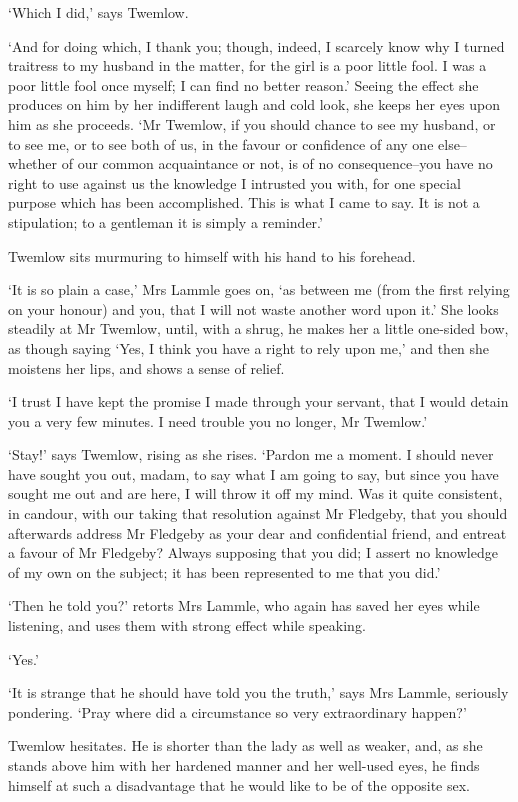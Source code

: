 ‘Which I did,’ says Twemlow.

‘And for doing which, I thank you; though, indeed, I scarcely know why
I turned traitress to my husband in the matter, for the girl is a poor
little fool. I was a poor little fool once myself; I can find no better
reason.’ Seeing the effect she produces on him by her indifferent laugh
and cold look, she keeps her eyes upon him as she proceeds. ‘Mr Twemlow,
if you should chance to see my husband, or to see me, or to see both of
us, in the favour or confidence of any one else--whether of our common
acquaintance or not, is of no consequence--you have no right to use
against us the knowledge I intrusted you with, for one special purpose
which has been accomplished. This is what I came to say. It is not a
stipulation; to a gentleman it is simply a reminder.’

Twemlow sits murmuring to himself with his hand to his forehead.

‘It is so plain a case,’ Mrs Lammle goes on, ‘as between me (from the
first relying on your honour) and you, that I will not waste another
word upon it.’ She looks steadily at Mr Twemlow, until, with a shrug,
he makes her a little one-sided bow, as though saying ‘Yes, I think you
have a right to rely upon me,’ and then she moistens her lips, and shows
a sense of relief.

‘I trust I have kept the promise I made through your servant, that I
would detain you a very few minutes. I need trouble you no longer, Mr
Twemlow.’

‘Stay!’ says Twemlow, rising as she rises. ‘Pardon me a moment. I should
never have sought you out, madam, to say what I am going to say, but
since you have sought me out and are here, I will throw it off my mind.
Was it quite consistent, in candour, with our taking that resolution
against Mr Fledgeby, that you should afterwards address Mr Fledgeby as
your dear and confidential friend, and entreat a favour of Mr Fledgeby?
Always supposing that you did; I assert no knowledge of my own on the
subject; it has been represented to me that you did.’

‘Then he told you?’ retorts Mrs Lammle, who again has saved her eyes
while listening, and uses them with strong effect while speaking.

‘Yes.’

‘It is strange that he should have told you the truth,’ says Mrs
Lammle, seriously pondering. ‘Pray where did a circumstance so very
extraordinary happen?’

Twemlow hesitates. He is shorter than the lady as well as weaker, and,
as she stands above him with her hardened manner and her well-used eyes,
he finds himself at such a disadvantage that he would like to be of the
opposite sex.

